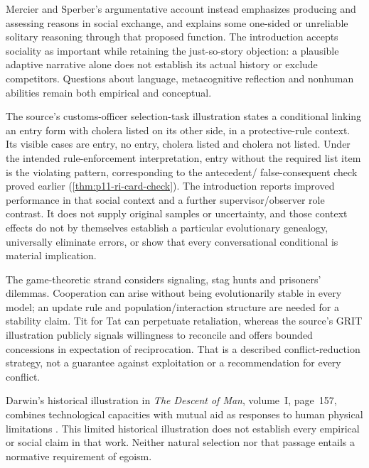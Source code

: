 Mercier and Sperber's argumentative account instead emphasizes
producing and assessing reasons in social exchange, and explains some
one-sided or unreliable solitary reasoning through that proposed
function. The introduction accepts sociality as important while
retaining the just-so-story objection: a plausible adaptive narrative
alone does not establish its actual history or exclude competitors.
Questions about language, metacognitive reflection and nonhuman
abilities remain both empirical and conceptual.

The source's customs-officer selection-task illustration states a
conditional linking an entry form with cholera listed on its other
side, in a protective-rule context. Its visible cases are entry,
no entry, cholera listed and cholera not listed. Under the intended
rule-enforcement interpretation, entry without the required list
item is the violating pattern, corresponding to the antecedent/
false-consequent check proved earlier
(\cref{thm:p11-ri-card-check}). The introduction reports improved
performance in that social context and a further supervisor/observer
role contrast. It does not supply original samples or uncertainty,
and those context effects do not by themselves establish a particular
evolutionary genealogy, universally eliminate errors, or show that
every conversational conditional is material implication.

The game-theoretic strand considers signaling, stag hunts and prisoners'
dilemmas. Cooperation can arise without being evolutionarily stable
in every model; an update rule and population/interaction structure
are needed for a stability claim. Tit for Tat can perpetuate retaliation,
whereas the source's GRIT illustration publicly signals willingness
to reconcile and offers bounded concessions in expectation of
reciprocation. That is a described conflict-reduction strategy, not a
guarantee against exploitation or a recommendation for every conflict.

Darwin's historical illustration in \emph{The Descent of Man},
volume~I, page~157, combines technological capacities with mutual aid
as responses to human physical limitations
\cite[p.~157]{Darwin1871DescentVolOne}.
This limited historical illustration does not establish every empirical
or social claim in that work. Neither natural selection
nor that passage entails a normative requirement of egoism.

